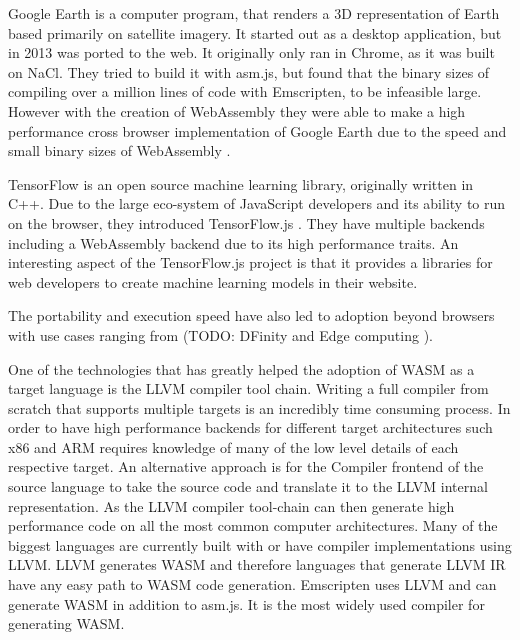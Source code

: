 \documentclass[11pt]{book}
\begin{document}
Google Earth\cite{google-earth-history} is a computer program, that renders a 3D representation of Earth based primarily on satellite imagery. It started out as a desktop application, but in 2013 was ported to the web. It originally only ran in Chrome, as it was built on NaCl. They tried to build it with asm.js, but found that the binary sizes of compiling over a million lines of code with Emscripten, to be infeasible large. However with the creation of WebAssembly they were able to make a high performance cross browser implementation of Google Earth due to the speed and small binary sizes of WebAssembly \cite{google-earth}.

TensorFlow \cite{tensorflow} is an open source machine learning library, originally written in C++. Due to the large eco-system of JavaScript developers and its ability to run on the browser, they introduced TensorFlow.js \cite{tensorflowjs}. They have multiple backends including a WebAssembly backend due to its high performance traits. An interesting aspect of the TensorFlow.js project is that it provides a libraries for web developers to create machine learning models in their website. 

The portability and execution speed have also led to adoption beyond browsers with use cases ranging from (TODO: DFinity and Edge computing \cite{Fellow_edgecomputing:}).  



One of the technologies that has greatly helped the adoption of WASM as a target language is the LLVM \cite{llvm} compiler tool chain. Writing a full compiler from scratch that supports multiple targets is an incredibly time consuming process. In order to have high performance backends for different target architectures such x86 and ARM requires knowledge of many of the low level details of each respective target. An alternative approach is for the Compiler frontend of the source language to take the source code and translate it to the LLVM internal representation. As the LLVM compiler tool-chain can then generate high performance code on all the most common computer architectures. Many of the biggest languages are currently built with or have compiler implementations using LLVM.
LLVM generates WASM and therefore languages that generate LLVM IR have any easy path to WASM code generation. 
Emscripten uses LLVM and can generate WASM in addition to asm.js. It is the most widely used compiler for generating WASM.
\end{document}
